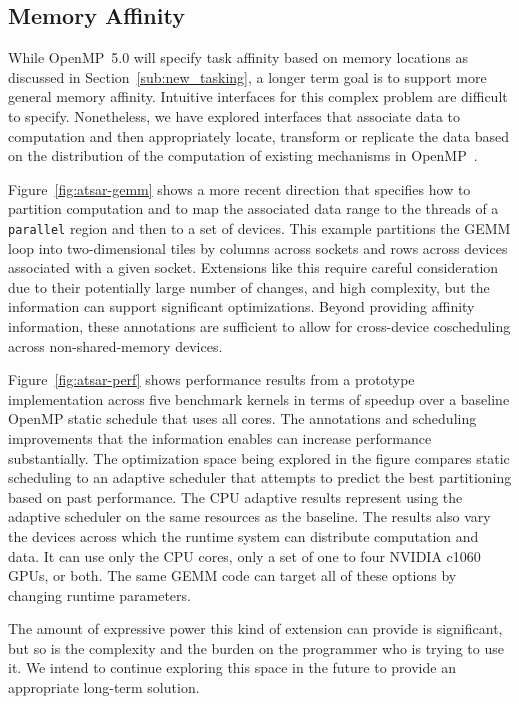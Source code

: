 \subsection{Memory Affinity}
\label{sub:memory_affinity}

While OpenMP~5.0 will specify task affinity based on memory locations 
as discussed in Section~\ref{sub:new_tasking}, a longer term goal is to 
support more general memory affinity. Intuitive interfaces for this complex 
problem are difficult to specify. Nonetheless, we have explored interfaces
that associate data to computation and then appropriately locate, transform 
or replicate the data based on the distribution of the computation of existing
mechanisms in OpenMP~\cite{ctsar-tpds,scogland:7Hpt64iV}.
 
Figure~\ref{fig:atsar-gemm} shows a more recent direction that specifies how
to partition computation and to map the associated data range to the threads 
of a \texttt{parallel} region and then to a set of devices. This example 
partitions the GEMM loop into two-dimensional tiles by columns across sockets 
and rows across devices associated with a given socket. Extensions like this 
require careful consideration due to their potentially large number of changes,
and high complexity, but the information can support significant optimizations.
Beyond providing affinity information, these annotations are sufficient to 
allow for cross-device coscheduling across non-shared-memory devices.

Figure~\ref{fig:atsar-perf} shows performance results from a prototype 
implementation across five benchmark kernels in terms of speedup over a 
baseline OpenMP static schedule that uses all cores. The annotations and 
scheduling improvements that the information enables can increase performance 
substantially.  The optimization space being explored in the figure compares
static scheduling to an adaptive scheduler that attempts to predict the best 
partitioning based on past performance. The CPU adaptive results represent 
using the adaptive scheduler on the same resources as the baseline. The 
results also vary the devices across which the runtime system can 
distribute computation and data. It can use only the CPU cores, only a
set of one to four NVIDIA c1060 GPUs, or both. The same GEMM code can target
all of these options by changing runtime parameters.

The amount of expressive power this kind of extension can provide is
significant, but so is the complexity and the burden on the programmer who is
trying to use it.  We intend to continue exploring this space in the future to
provide an appropriate long-term solution.

